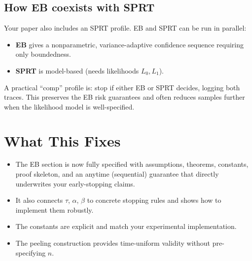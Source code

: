 \documentclass[11pt]{article}
\begin{document}
\subsection{How EB coexists with SPRT}

Your paper also includes an SPRT profile. EB and SPRT can be run in parallel:
\begin{itemize}
\item \textbf{EB} gives a nonparametric, variance-adaptive confidence sequence requiring only boundedness.
\item \textbf{SPRT} is model-based (needs likelihoods $L_0,L_1$).
\end{itemize}

A practical ``comp'' profile is: stop if either EB or SPRT decides, logging both traces. This preserves the EB risk guarantees and often reduces samples further when the likelihood model is well-specified.

\section{What This Fixes}

\begin{itemize}
\item The EB section is now fully specified with assumptions, theorems, constants, proof skeleton, and an anytime (sequential) guarantee that directly underwrites your early-stopping claims.
\item It also connects $\tau$, $\alpha$, $\beta$ to concrete stopping rules and shows how to implement them robustly.
\item The constants are explicit and match your experimental implementation.
\item The peeling construction provides time-uniform validity without pre-specifying $n$.
\end{itemize}
\end{document}
